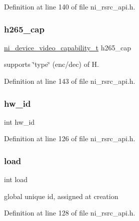 Definition at line 140 of file ni\+\_\+rsrc\+\_\+api.\+h.

\mbox{\label{struct__ni__device__info_a14659846c62b4d04fd543bb70e50be25}} 
\subsubsection{\texorpdfstring{h265\_cap}{h265\_cap}}
{\footnotesize\ttfamily \mbox{\hyperlink{ni__rsrc__api_8h_adf4d30f539dbb9bae2cdf26a53baafeb}{ni\+\_\+device\+\_\+video\+\_\+capability\+\_\+t}} h265\+\_\+cap}

supports \char`\"{}type\char`\"{} (enc/dec) of H. 

Definition at line 143 of file ni\+\_\+rsrc\+\_\+api.\+h.

\mbox{\label{struct__ni__device__info_a0a8a4b1c98c0ad55e5854a002f18caba}} 
\subsubsection{\texorpdfstring{hw\_id}{hw\_id}}
{\footnotesize\ttfamily int hw\+\_\+id}



Definition at line 126 of file ni\+\_\+rsrc\+\_\+api.\+h.

\mbox{\label{struct__ni__device__info_aa1843f81d109cc0b7f234d61b5662119}} 
\subsubsection{\texorpdfstring{load}{load}}
{\footnotesize\ttfamily int load}

global unique id, assigned at creation 

Definition at line 128 of file ni\+\_\+rsrc\+\_\+api.\+h.

\mbox{\label{struct__ni__device__info_ad70c9254e2a51831bfd8b769d977a6a9}} 
